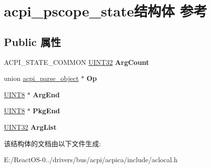 \hypertarget{structacpi__pscope__state}{}\section{acpi\+\_\+pscope\+\_\+state结构体 参考}
\label{structacpi__pscope__state}
\subsection*{Public 属性}
\begin{DoxyCompactItemize}
\item 
\mbox{\label{structacpi__pscope__state_ac67721c859153bc2a0936c2d78bc23c6}} 
A\+C\+P\+I\+\_\+\+S\+T\+A\+T\+E\+\_\+\+C\+O\+M\+M\+ON \hyperlink{_processor_bind_8h_ae1e6edbbc26d6fbc71a90190d0266018}{U\+I\+N\+T32} {\bfseries Arg\+Count}
\item 
\mbox{\label{structacpi__pscope__state_a97ade0f5d7615afc13a8077603f14880}} 
union \hyperlink{unionacpi__parse__object}{acpi\+\_\+parse\+\_\+object} $\ast$ {\bfseries Op}
\item 
\mbox{\label{structacpi__pscope__state_aa89e909cddc48d01a0ebfc1e0ac79f04}} 
\hyperlink{_processor_bind_8h_ab27e9918b538ce9d8ca692479b375b6a}{U\+I\+N\+T8} $\ast$ {\bfseries Arg\+End}
\item 
\mbox{\label{structacpi__pscope__state_a2c5693fe2f9ea0d3003b2dae99067f06}} 
\hyperlink{_processor_bind_8h_ab27e9918b538ce9d8ca692479b375b6a}{U\+I\+N\+T8} $\ast$ {\bfseries Pkg\+End}
\item 
\mbox{\label{structacpi__pscope__state_a3c793cf07a04a088149d25c32440056d}} 
\hyperlink{_processor_bind_8h_ae1e6edbbc26d6fbc71a90190d0266018}{U\+I\+N\+T32} {\bfseries Arg\+List}
\end{DoxyCompactItemize}


该结构体的文档由以下文件生成\+:\begin{DoxyCompactItemize}
\item 
E\+:/\+React\+O\+S-\/0../drivers/bus/acpi/acpica/include/aclocal.\+h\end{DoxyCompactItemize}
